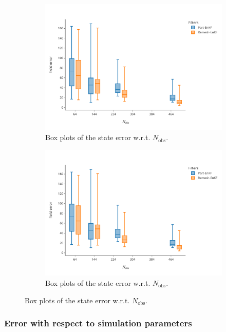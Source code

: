 \begin{figure}[h!]
	\centering
	\begin{subfigure}{0.49\linewidth}
		\includegraphics[width=0.6\linewidth]{./images/app2d/final/MSE_nobs_box.pdf}
		\caption{Box plots of the state error w.r.t. $N_{\text{obs}}$.}
		\label{fig:nobs_1}
	\end{subfigure}
	\begin{subfigure}{0.49\linewidth}
		\includegraphics[width=0.6\linewidth]{./images/app2d/final/MSE_nobs_box.pdf}
		\caption{Box plots of the state error w.r.t. $N_{\text{obs}}$.}
		\label{fig:nobs_2}
	\end{subfigure}
	\label{fig:nobs}

	\label{fig:assim_params}
\end{figure}

\subsubsection{Error with respect to simulation parameters}

